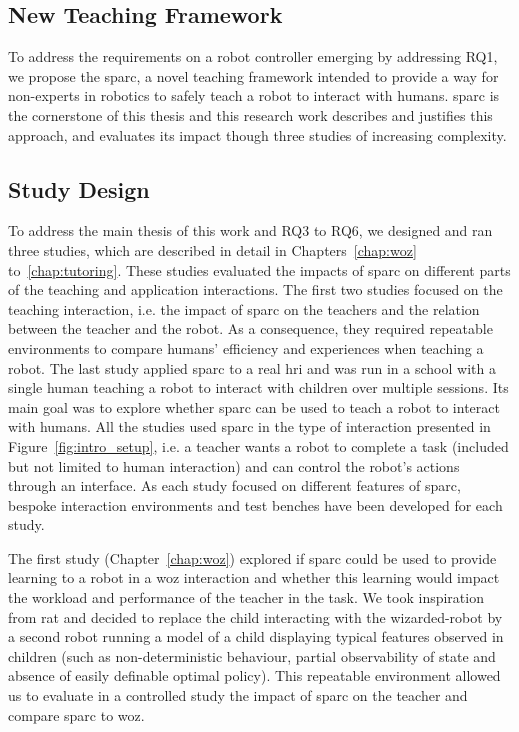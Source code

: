 \subsection{New Teaching Framework}

To address the requirements on a robot controller emerging by addressing RQ1, we propose the \gls{sparc}, a novel teaching framework intended to provide a way for non-experts in robotics to safely teach a robot to interact with humans. \gls{sparc} is the cornerstone of this thesis and this research work describes and justifies this approach, and evaluates its impact though three studies of increasing complexity.

\subsection{Study Design} 

To address the main thesis of this work and RQ3 to RQ6, we designed and ran three studies, which are described in detail in Chapters~\ref{chap:woz} to~\ref{chap:tutoring}. These studies evaluated the impacts of \gls{sparc} on different parts of the teaching and application interactions. The first two studies focused on the teaching interaction, i.e. the impact of \gls{sparc} on the teachers and the relation between the teacher and the robot. As a consequence, they required repeatable environments to compare humans' efficiency and experiences when teaching a robot. The last study applied \gls{sparc} to a real \gls{hri} and was run in a school with a single human teaching a robot to interact with children over multiple sessions. Its main goal was to explore whether \gls{sparc} can be used to teach a robot to interact with humans. All the studies used \gls{sparc} in the type of interaction presented in Figure~\ref{fig:intro_setup}, i.e. a teacher wants a robot to complete a task (included but not limited to human interaction) and can control the robot's actions through an interface. As each study focused on different features of \gls{sparc}, bespoke interaction environments and test benches have been developed for each study.

The first study (Chapter~\ref{chap:woz}) explored if \gls{sparc} could be used to provide learning to a robot in a \gls{woz} interaction and whether this learning would impact the workload and performance of the teacher in the task. We took inspiration from \gls{rat} and decided to replace the child interacting with the wizarded-robot by a second robot running a model of a child displaying typical features observed in children (such as non-deterministic behaviour, partial observability of state and absence of easily definable optimal policy). This repeatable environment allowed us to evaluate in a controlled study the impact of \gls{sparc} on the teacher and compare \gls{sparc} to \gls{woz}.

